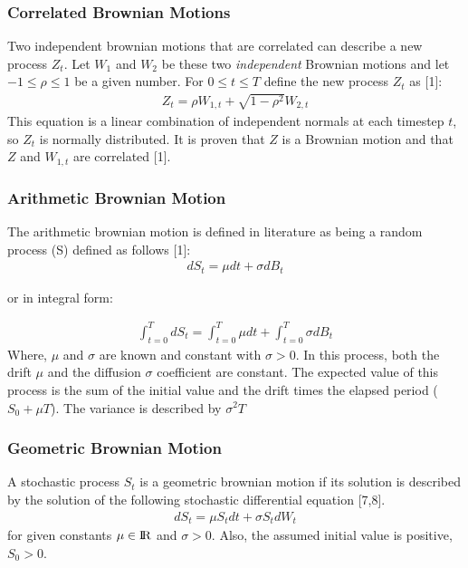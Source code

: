 \documentclass[12pt,twoside]{reedthesis}
\theoremstyle{definition}
\theoremstyle{definition}
\theoremstyle{remark}
\begin{document}
  \subsubsection{Correlated Brownian Motions}\label{corr}
  
  Two independent brownian motions that are correlated can describe a new
  process \(Z_t\). Let \(W_1\) and \(W_2\) be these two \emph{independent}
  Brownian motions and let \(-1 \leq \rho \leq 1\) be a given number. For
  \(0 \leq t \leq T\) define the new process \(Z_t\) as {[}1{]}:
  \begin{align}
  \label{eq:corr_brow}
  Z_t = \rho W_{1,t} + \sqrt{1-\rho^2}W_{2,t}
  \end{align}
  \noindent
  This equation is a linear combination of independent normals at each
  timestep \(t\), so \(Z_t\) is normally distributed. It is proven that
  \(Z\) is a Brownian motion and that \(Z\) and \(W_{1,t}\) are correlated
  {[}1{]}.
  
  \subsubsection{Arithmetic Brownian Motion}\label{abm}
  
  The arithmetic brownian motion is defined in literature as being a
  random process (S) defined as follows {[}1{]}:
  \begin{align}
  dS_t = \mu dt + \sigma dB_t
  \end{align}
  \begin{center}or in integral form:\end{center}
  \begin{align}
  \int_{t=0}^{T} dS_t = \int_{t=0}^{T}{\mu dt} + \int_{t=0}^{T}{\sigma dB_t}
  \end{align}
  \noindent
  Where, \(\mu\) and \(\sigma\) are known and constant with
  \(\sigma > 0\). In this process, both the drift \(\mu\) and the
  diffusion \(\sigma\) coefficient are constant. The expected value of
  this process is the sum of the initial value and the drift times the
  elapsed period (\(S_0 + \mu T\)). The variance is described by
  \(\sigma^2 T\)
  
  \subsubsection{Geometric Brownian Motion}\label{gbm}
  
  A stochastic process \(S_t\) is a geometric brownian motion if its
  solution is described by the solution of the following stochastic
  differential equation {[}7,8{]}.
  \begin{align}
  dS_t = \mu S_t dt + \sigma S_t dW_t
  \end{align}
  \noindent
  for given constants \(\mu \in {\rm I\!R}\) and \(\sigma > 0\). Also, the
  assumed initial value is positive, \(S_0 >0\).
  
\end{document}
